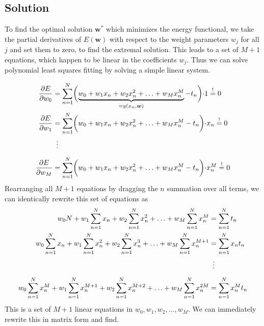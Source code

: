 \documentclass[11pt,DINA4, fleqn]{amsart}
\def\vw{\boldsymbol{w}\xspace}
\begin{document}
\subsection*{Solution}
To find the optimal solution $\vw^*$ which minimizes the energy functional, we take the partial derivatives of $E(\vw)$ with respect to the weight parameters $w_j$ for all $j$ and set them to zero, to find the extremal solution. This leads to a set of $M+1$ equations, which happen to be linear in the coefficients $w_j$. Thus we can solve polynomial least squares fitting by solving a simple linear system.

\begin{align}
\dfrac{\partial E}{\partial w_0} &= \sum \displaylimits_{n = 1}^{N}
\biggl(\underbrace{w_0 + w_1 x_n + w_2 x_n^2 + \dotsc + w_M x_n^M}_{=y(x_n,\vw)} - t_n\biggl) \cdot 1
\overset{!}{=} 0 \\
\dfrac{\partial E}{\partial w_1} &= \sum \displaylimits_{n = 1}^{N}
\biggl(w_0 + w_1 x_n + w_2 x_n^2 + \dotsc + w_M x_n^M - t_n\biggl) \cdot x_n
\overset{!}{=} 0 \\
\phantom{\dfrac{\partial E}{\partial w_M}}&\,\,\,\vdots \\
\dfrac{\partial E}{\partial w_M} &= \sum \displaylimits_{n = 1}^{N}
\biggl(w_0 + w_1 x_n + w_2 x_n^2 + \dotsc + w_M x_n^M - t_n\biggl) \cdot x_n^M
\overset{!}{=} 0
\end{align}
Rearranging all $M+1$ equations by dragging the $n$ summation over all terms, we can identically rewrite this set of equations as
\begin{align}
w_0 N + w_1 \sum\displaylimits_{n = 1}^{N}x_n
+ w_2 \sum\displaylimits_{n = 1}^{N}x_n^2 + \dotsc + w_M \sum\displaylimits_{n = 1}^{N}x_n^M  &= \sum\displaylimits_{n = 1}^{N} t_n \\
w_0 \sum\displaylimits_{n = 1}^{N} x_n + w_1 \sum\displaylimits_{n = 1}^{N}x_n^2
+ w_2 \sum\displaylimits_{n = 1}^{N}x_n^3 + \dotsc + w_M \sum\displaylimits_{n = 1}^{N}x_n^{M + 1}  &= \sum\displaylimits_{n = 1}^{N} x_n t_n
 \\
\phantom{\dfrac{\partial E}{\partial w_M}}&\,\,\,\vdots \\
w_0 \sum\displaylimits_{n = 1}^{N} x_n^M + w_1 \sum\displaylimits_{n = 1}^{N}x_n^{M+1}
+ w_2 \sum\displaylimits_{n = 1}^{N}x_n^{M+2} + \dotsc + w_M \sum\displaylimits_{n = 1}^{N}x_n^{2M}  &= \sum\displaylimits_{n = 1}^{N} x_n^M t_n
\end{align}
This is a set of $M+1$ linear equations in $w_0, w_1, w_2, \dotsc, w_M$. We can immediately rewrite this in matrix form and find.
\end{document}
